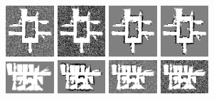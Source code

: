 \documentclass[letterpaper, 10 pt, conference]{ieeeconf} %
\begin{document}
\begin{figure}
  \includegraphics[width=0.16\textwidth]{../../Data/hospital_player/SICKSlowMetropolis.png}%
  \includegraphics[width=0.16\textwidth]{../../Data/hospital_player/SICKDDMCMC.png}%
  \includegraphics[width=0.16\textwidth]{../../Data/hospital_player/run_belief_propagation.png}%
  \includegraphics[width=0.16\textwidth]{../../Data/hospital_player/dualdecomposition.png}\\
  \includegraphics[width=0.16\textwidth]{../../Data/hospital_section_player/gt-final.png}%
  \includegraphics[width=0.16\textwidth, trim=0 0 0 3px, clip]{../../Data/hospital_section_player/TwoAssumptionAlgo.png}%
  \includegraphics[width=0.16\textwidth, trim=0 0 0 3px, clip]{../../Data/hospital_section_player/SICKSlowMetropolis.png}%
  \includegraphics[width=0.16\textwidth, trim=0 0 0 3px, clip]{../../Data/hospital_section_player/SICKDDMCMC.png}%

\end{figure}
\end{document}
